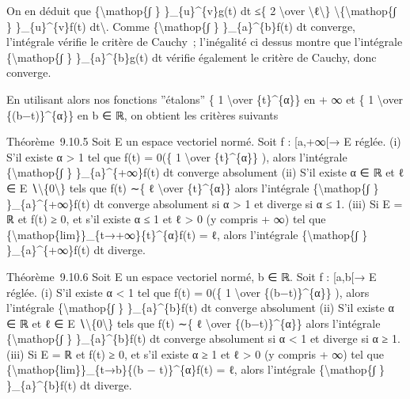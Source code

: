 \documentclass[]{article}
\begin{document}
On en déduit que \{\textbackslash{}mathop\{∫ \} \}\_\{u\}\^{}\{v\}g(t)
dt ≤\{ 2 \textbackslash{}over
\textbackslash{}\textbar{}ℓ\textbackslash{}\textbar{}\}
\textbackslash{}\textbar{}\{\textbackslash{}mathop\{∫ \}
\}\_\{u\}\^{}\{v\}f(t) dt\textbackslash{}\textbar{}. Comme
\{\textbackslash{}mathop\{∫ \} \}\_\{a\}\^{}\{b\}f(t) dt converge,
l'intégrale vérifie le critère de Cauchy~; l'inégalité ci dessus montre
que l'intégrale \{\textbackslash{}mathop\{∫ \} \}\_\{a\}\^{}\{b\}g(t) dt
vérifie également le critère de Cauchy, donc converge.

En utilisant alors nos fonctions ''étalons'' \{ 1 \textbackslash{}over
\{t\}\^{}\{α\}\} en + ∞ et \{ 1 \textbackslash{}over
\{(b−t)\}\^{}\{α\}\} en b ∈ ℝ, on obtient les critères suivants

Théorème~9.10.5 Soit E un espace vectoriel normé. Soit f : {[}a,+∞{[}→ E
réglée. (i) S'il existe α \textgreater{} 1 tel que f(t) = 0(\{ 1
\textbackslash{}over \{t\}\^{}\{α\}\} ), alors l'intégrale
\{\textbackslash{}mathop\{∫ \} \}\_\{a\}\^{}\{+∞\}f(t) dt converge
absolument (ii) S'il existe α ∈ ℝ et ℓ ∈ E
∖\textbackslash{}\{0\textbackslash{}\} tels que f(t) ∼\{ ℓ
\textbackslash{}over \{t\}\^{}\{α\}\} alors l'intégrale
\{\textbackslash{}mathop\{∫ \} \}\_\{a\}\^{}\{+∞\}f(t) dt converge
absolument si α \textgreater{} 1 et diverge si α ≤ 1. (iii) Si E = ℝ et
f(t) ≥ 0, et s'il existe α ≤ 1 et ℓ \textgreater{} 0 (y compris + ∞) tel
que \{\textbackslash{}mathop\{lim\}\}\_\{t→+∞\}\{t\}\^{}\{α\}f(t) = ℓ,
alors l'intégrale \{\textbackslash{}mathop\{∫ \} \}\_\{a\}\^{}\{+∞\}f(t)
dt diverge.

Théorème~9.10.6 Soit E un espace vectoriel normé, b ∈ ℝ. Soit f :
{[}a,b{[}→ E réglée. (i) S'il existe α \textless{} 1 tel que f(t) = 0(\{
1 \textbackslash{}over \{(b−t)\}\^{}\{α\}\} ), alors l'intégrale
\{\textbackslash{}mathop\{∫ \} \}\_\{a\}\^{}\{b\}f(t) dt converge
absolument (ii) S'il existe α ∈ ℝ et ℓ ∈ E
∖\textbackslash{}\{0\textbackslash{}\} tels que f(t) ∼\{ ℓ
\textbackslash{}over \{(b−t)\}\^{}\{α\}\} alors l'intégrale
\{\textbackslash{}mathop\{∫ \} \}\_\{a\}\^{}\{b\}f(t) dt converge
absolument si α \textless{} 1 et diverge si α ≥ 1. (iii) Si E = ℝ et
f(t) ≥ 0, et s'il existe α ≥ 1 et ℓ \textgreater{} 0 (y compris + ∞) tel
que \{\textbackslash{}mathop\{lim\}\}\_\{t→b\}\{(b − t)\}\^{}\{α\}f(t) =
ℓ, alors l'intégrale \{\textbackslash{}mathop\{∫ \}
\}\_\{a\}\^{}\{b\}f(t) dt diverge.
\end{document}
